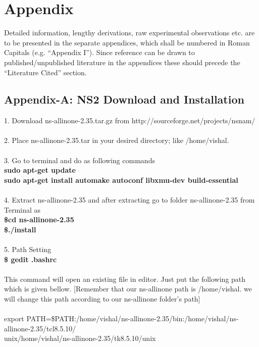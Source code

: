 \chapter*{Appendix}
Detailed information, lengthy derivations, raw experimental observations etc. are to be
presented in the separate appendices, which shall be numbered in Roman Capitals (e.g.
“Appendix I”). Since reference can be drawn to published/unpublished literature in the
appendices these should precede the “Literature Cited” section.\\

\section*{Appendix-A: NS2 Download and Installation}
1. Download ns-allinone-2.35.tar.gz from http://sourceforge.net/projects/nsnam/\\
\\
2. Place ns-allinone-2.35.tar in your desired directory; like /home/vishal.\\
\\
3. Go to terminal and do as following commands\\
\textbf{sudo apt-get update}\\
\textbf{sudo apt-get install automake autoconf libxmu-dev build-essential}\\
\\
4. Extract ns-allinone-2.35 and after extracting go to folder ns-allinone-2.35 from Terminal as\\
\textbf{\$cd ns-allinone-2.35}\\
\textbf{\$./install}\\
\\
5. Path Setting\\
\textbf{\$ gedit .bashrc}\\
\\
This command will open an existing file in editor. Just put the following path which is given bellow. [Remember that our ns-allinone path is /home/vishal. we will change this path according to our ns-allinone folder's path]\\
\\
export PATH=\$PATH:/home/vishal/ns-allinone-2.35/bin:/home/vishal/ns-allinone-2.35/tcl8.5.10/\\
unix/home/vishal/ns-allinone-2.35/tk8.5.10/unix\\
\\
